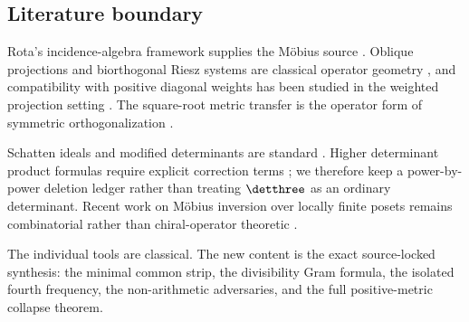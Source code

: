 \subsection{Literature boundary}

Rota's incidence-algebra framework supplies the M\"obius source
\citep{Rota1964}.  Oblique projections and biorthogonal Riesz systems
are classical operator geometry \citep{Tang2000}, and compatibility
with positive diagonal weights has been studied in the weighted
projection setting \citep{AntezanaEtAl2004}.  The square-root metric
transfer is the operator form of symmetric orthogonalization
\citep{Lowdin1950}.

Schatten ideals and modified determinants are standard
\citep{Simon2005}.  Higher determinant product formulas require
explicit correction terms \citep{BritzEtAl2020,KoutsonikosLesch2022};
we therefore keep a power-by-power deletion ledger rather than treating
$\detthree$ as an ordinary determinant.  Recent work on M\"obius
inversion over locally finite posets remains combinatorial rather than
chiral-operator theoretic \citep{Goh2026}.

The individual tools are classical.  The new content is the exact
source-locked synthesis: the minimal common strip, the divisibility
Gram formula, the isolated fourth frequency, the non-arithmetic
adversaries, and the full positive-metric collapse theorem.
